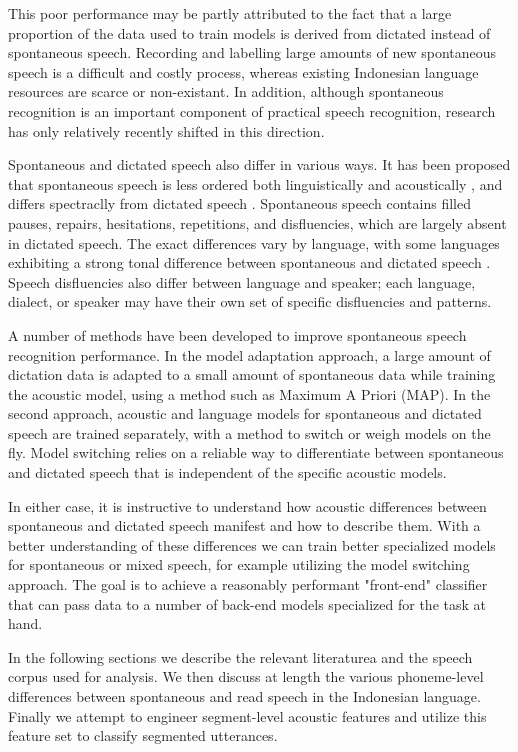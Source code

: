 \documentclass[conference]{IEEEtran}
\begin{document}
This poor performance may be partly attributed to the fact that a large proportion of the data used to train models is derived from dictated instead of spontaneous speech.
Recording and labelling large amounts of new spontaneous speech is a difficult and costly process, whereas existing Indonesian language resources are scarce or non-existant.
In addition, although spontaneous recognition is an important component of practical speech recognition, research has only relatively recently shifted in this direction.

Spontaneous and dictated speech also differ in various ways.
It has been proposed that spontaneous speech is less ordered both linguistically and acoustically \cite{nakamura1}, and differs spectraclly from dictated speech \cite{nakamura2}.
Spontaneous speech contains filled pauses, repairs, hesitations, repetitions, and disfluencies, which are largely absent in dictated speech.
The exact differences vary by language, with some languages exhibiting a strong tonal difference between spontaneous and dictated speech \cite{spanish}\cite{dwello}.
Speech disfluencies also differ between language and speaker; each language, dialect, or speaker may have their own set of specific disfluencies and patterns.

A number of methods have been developed to improve spontaneous speech recognition performance.
In the model adaptation approach, a large amount of dictation data is adapted to a small amount of spontaneous data while training the acoustic model, using a method such as Maximum A Priori (MAP).
In the second approach, acoustic and language models for spontaneous and dictated speech are trained separately, with a method to switch or weigh models on the fly.
Model switching relies on a reliable way to differentiate between spontaneous and dictated speech that is independent of the specific acoustic models.

In either case, it is instructive to understand how acoustic differences between spontaneous and dictated speech manifest and how to describe them.
With a better understanding of these differences we can train better specialized models for spontaneous or mixed speech, for example utilizing the model switching approach.
The goal is to achieve a reasonably performant "front-end" classifier that can pass data to a number of back-end models specialized for the task at hand.

In the following sections we describe the relevant literaturea and the speech corpus used for analysis.
We then discuss at length the various phoneme-level differences between spontaneous and read speech in the Indonesian language.
Finally we attempt to engineer segment-level acoustic features and utilize this feature set to classify segmented utterances.
\end{document}
